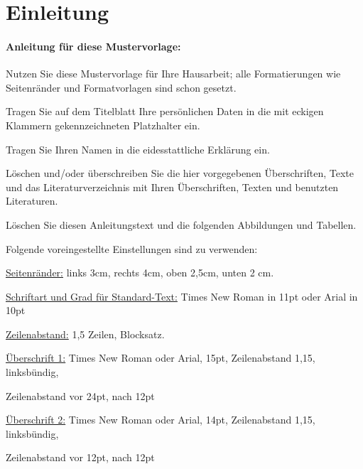 \section{Einleitung}
\label{sec:kapitel1}

\paragraph{Anleitung für diese Mustervorlage:}
$\;$\\
Nutzen Sie diese Mustervorlage für Ihre Hausarbeit; alle Formatierungen wie Seitenränder und Formatvorlagen sind schon gesetzt. 

Tragen Sie auf dem Titelblatt Ihre persönlichen Daten in die mit eckigen Klammern gekennzeichneten Platzhalter ein.

Tragen Sie Ihren Namen in die eidesstattliche Erklärung ein.

Löschen und/oder überschreiben Sie die hier vorgegebenen Überschriften, Texte und das Literaturverzeichnis mit Ihren Überschriften, Texten und benutzten Literaturen.

Löschen Sie diesen Anleitungstext und die folgenden Abbildungen und Tabellen.


$\;$\\

Folgende voreingestellte Einstellungen sind zu verwenden:




\hspace{10mm}\underline{Seitenränder:} links 3cm, rechts 4cm, oben 2,5cm, unten 2 cm.

\hspace{10mm}\underline{Schriftart und Grad für Standard-Text:} Times New Roman in 11pt oder Arial in 10pt

\hspace{10mm}\underline{Zeilenabstand:} 1,5 Zeilen, Blocksatz.

\hspace{10mm}\underline{Überschrift 1:} Times New Roman oder Arial, 15pt, Zeilenabstand 1,15, linksbündig,

\hspace{10mm} Zeilenabstand vor 24pt, nach 12pt 

\hspace{10mm}\underline{Überschrift 2:} Times New Roman oder Arial, 14pt, Zeilenabstand 1,15, linksbündig,

\hspace{10mm}Zeilenabstand vor 12pt, nach 12pt 

